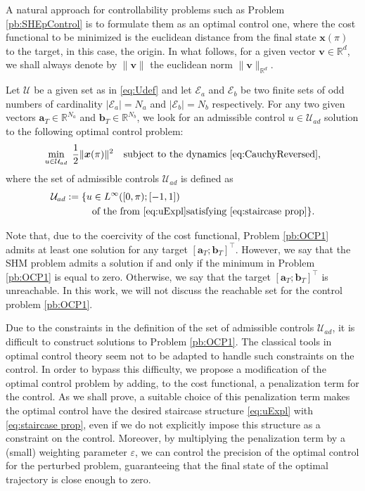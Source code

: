 \documentclass[twocolumn]{autart}    %
\begin{document}
A natural approach for controllability problems such as Problem \ref{pb:SHEpControl} is to formulate them as an optimal control one, where the cost functional to be minimized is the euclidean distance from the final state $\bm{x}(\pi)$ to the target, in this case, the origin. In what follows, for a given vector $\bm{v}\in\mathbb{R}^d$, we shall always denote by $\|\bm{v}\|$ the euclidean norm $\|\bm{v}\|_{\mathbb{R}^d}$.
\newline

\begin{problem}\label{pb:OCP1}
Let $\mathcal{U}$ be a given set as in \eqref{eq:Udef} and let $\mathcal{E}_a $ and $\mathcal{E} _b $ be two finite sets of odd numbers of cardinality $|\mathcal{E}_a| = N_a $ and $ |\mathcal{E} _b| = N_b$ respectively. For any two given vectors $\bm{a}_T \in \mathbb{R}^{N_a}$ and $\bm{b}_T \in \mathbb{R}^{N_b} $, we look for an admissible control $u\in \mathcal{U}_{ad}$ solution to the following optimal control problem:
\begin{equation*}
	\min_{u \in \mathcal{U}_{ad}}\;\frac 12 \|\bm{x}(\pi)\|^2 \quad \text{subject to the dynamics \eqref{eq:CauchyReversed}},
\end{equation*}
where the set of admissible controls $\mathcal{U}_{ad}$ is defined as
\begin{align*}
	\mathcal{U}_{ad} := \{ u&\in L^\infty ([0,\pi); [-1,1]) 
	\\ 
	&\text{of the from \eqref{eq:uExpl}} \text{satisfying \eqref{eq:staircase prop}} \}.
\end{align*}
\end{problem}

\begin{remark}
Note that, due to the coercivity of the cost functional, Problem \ref{pb:OCP1} admits at least one solution for any target $[\bm{a}_T;\bm{b}_T]^\top$. However, we say that the SHM problem admits a solution if and only if the minimum in Problem \ref{pb:OCP1} is equal to zero. Otherwise, we say that the target $[\bm{a}_T;\bm{b}_T]^\top$ is unreachable. In this work, we will not discuss the reachable set for the control problem \eqref{pb:OCP1}.
\end{remark}

Due to the constraints in the definition of the set of admissible controls $\mathcal{U}_{ad}$,  it is difficult to construct solutions to Problem \ref{pb:OCP1}. The classical tools in optimal control theory seem not to be adapted to handle such constraints on the control. In order to bypass this difficulty, we propose a modification of the optimal control problem by adding, to the cost functional, a penalization term for the control. As we shall prove, a suitable choice of this penalization term makes the optimal control have the desired staircase structure \eqref{eq:uExpl} with \eqref{eq:staircase prop}, even if we do not explicitly impose this structure as a constraint on the control. Moreover, by multiplying the penalization term by a (small) weighting parameter $\varepsilon$, we can control the precision of the optimal control for the perturbed problem, guaranteeing that the final state of the optimal trajectory is close enough to zero.
\end{document}
